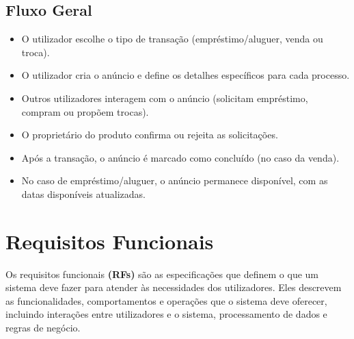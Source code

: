 \documentclass[a4paper, 12pt]{article} %
\begin{document}
\subsection{Fluxo Geral}
\begin{itemize}
	\item O utilizador escolhe o tipo de transação (empréstimo/aluguer, venda ou troca).
	\item O utilizador cria o anúncio e define os detalhes específicos para cada processo.
	\item Outros utilizadores interagem com o anúncio (solicitam empréstimo, compram ou propõem trocas).
	\item O proprietário do produto confirma ou rejeita as solicitações.
	\item Após a transação, o anúncio é marcado como concluído (no caso da venda).
	\item No caso de empréstimo/aluguer, o anúncio permanece disponível, com as datas disponíveis atualizadas.
\end{itemize}


\newpage
\section{Requisitos Funcionais}
Os requisitos funcionais \textbf{(RFs)} são as especificações que definem o que um sistema deve fazer para atender às necessidades dos utilizadores. Eles descrevem as funcionalidades, comportamentos e operações que o sistema deve oferecer, incluindo interações entre utilizadores e o sistema, processamento de dados e regras de negócio.
\end{document}
